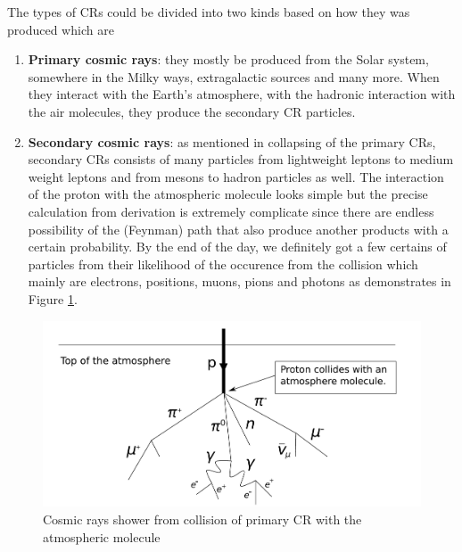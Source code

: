 The types of CRs could be divided into two kinds based on
how they was produced which are
\begin{enumerate}
    \item \textbf{Primary cosmic rays}: they mostly be produced from the
    Solar system, somewhere in the Milky ways, extragalactic sources
    and many more. When they interact with the Earth's atmosphere,
    with the hadronic interaction with the air molecules,
    they produce the secondary CR particles.
    \item \textbf{Secondary cosmic rays}: as mentioned in collapsing of the  
    primary CRs, secondary CRs consists of many particles
    from lightweight leptons to medium weight leptons and 
    from mesons to hadron particles as well. The interaction
    of the proton with the atmospheric molecule looks simple 
    but the precise calculation from derivation is extremely complicate 
    since there are endless possibility of the (Feynman) path that 
    also produce another products with a certain probability.
    By the end of the day, we definitely got a few certains 
    of particles from their likelihood of the occurence from 
    the collision which mainly are electrons, positions, muons,
    pions and photons as demonstrates in Figure \ref{fig:cr_shower}.
\end{enumerate}

\begin{figure}[h!]
    \centering
    \includegraphics[width=\textwidth]{content/background/figures/Atmospheric_Collision.pdf}
    \caption{Cosmic rays shower from collision of primary CR with the atmospheric molecule
    }
    \label{fig:cr_shower}
\end{figure}


